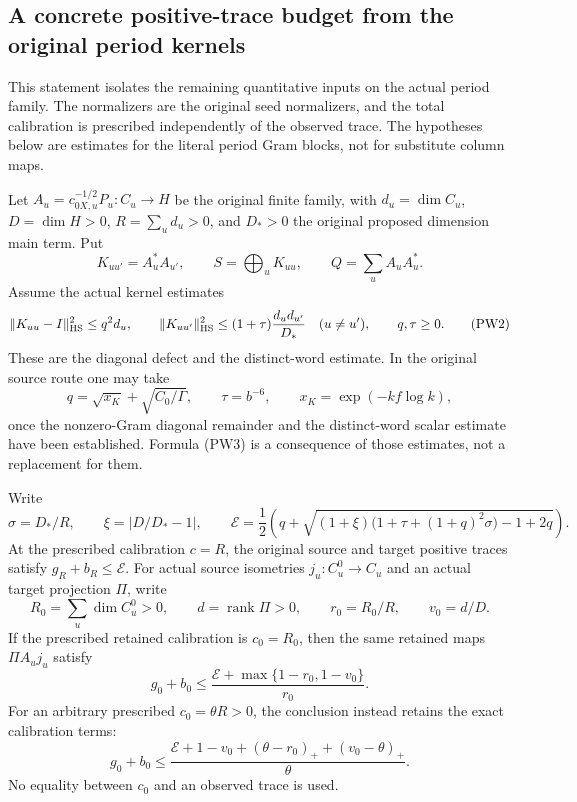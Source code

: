 \subsection{A concrete positive-trace budget from the original period kernels}
\label{sec:retained-period-window-budget}

This statement isolates the remaining quantitative inputs on the
actual period family.  The normalizers are the original seed
normalizers, and the total calibration is prescribed independently
of the observed trace.  The hypotheses below are estimates for
the literal period Gram blocks, not for substitute column maps.

Let \(A_u=c_{0X,u}^{-1/2}P_u:C_u\to H\) be the original
finite family, with \(d_u=\dim C_u\), \(D=\dim H>0\),
\(R=\sum_u d_u>0\), and \(D_*>0\) the original proposed
dimension main term.  Put
\[
 K_{uu'}=A_u^*A_{u'},\qquad
 S=\bigoplus_uK_{uu},\qquad Q=\sum_uA_uA_u^*.
                                                        \tag{PW1}
\]
Assume the actual kernel estimates
\[
 \|K_{uu}-I\|_{\rm HS}^2\le q^2d_u,
 \qquad
 \|K_{uu'}\|_{\rm HS}^2
       \le(1+\tau)\frac{d_ud_{u'}}{D_*}\quad(u\ne u'),
 \qquad q,\tau\ge0 .                                  \tag{PW2}
\]
These are the diagonal defect and the distinct-word estimate.
In the original source route one may take
\[
 q=\sqrt{x_K}+\sqrt{C_0/\Gamma},\qquad
 \tau=b^{-6},\qquad x_K=\exp(-kf\log k),                 \tag{PW3}
\]
once the nonzero-Gram diagonal remainder and the distinct-word
scalar estimate have been established.  Formula (PW3) is a
consequence of those estimates, not a replacement for them.

\begin{theorem}\label{thm:retained-period-window-budget}
Write
\[
 \sigma=D_*/R,\qquad \xi=|D/D_*-1|,\qquad
 \mathcal E=\frac12\left(q+
  \sqrt{(1+\xi)\bigl(1+\tau+(1+q)^2\sigma\bigr)-1+2q}
                         \right).                      \tag{PW4}
\]
At the prescribed calibration \(c=R\), the original source
and target positive traces satisfy \(g_R+b_R\le\mathcal E\).
For actual source isometries \(j_u:C_u^0\to C_u\) and an
actual target projection \(\Pi\), write
\[
 R_0=\sum_u\dim C_u^0>0,\qquad d=\operatorname{rank}\Pi>0,
 \qquad r_0=R_0/R,\qquad v_0=d/D.
\]
If the prescribed retained calibration is \(c_0=R_0\), then
the same retained maps \(\Pi A_uj_u\) satisfy
\[
 g_0+b_0\le
       \frac{\mathcal E+\max\{1-r_0,1-v_0\}}{r_0}.
                                                        \tag{PW5}
\]
For an arbitrary prescribed \(c_0=\theta R>0\), the conclusion
instead retains the exact calibration terms:
\[
 g_0+b_0\le
 \frac{\mathcal E+1-v_0+(\theta-r_0)_++(v_0-\theta)_+}
      {\theta}.                                       \tag{PW6}
\]
No equality between \(c_0\) and an observed trace is used.
\end{theorem}

